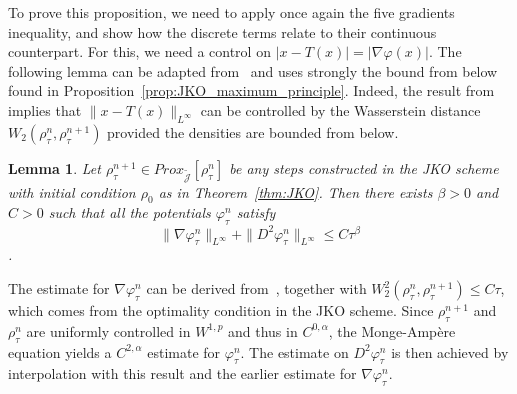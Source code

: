 \documentclass[a4paper,twosided, 11pt]{article}
\theoremstyle{plain}
\newtheorem{lemma}[thm]{Lemma}
\theoremstyle{remark}
\numberwithin{equation}{section}
\begin{document}
To prove this proposition, we need to apply once again the five gradients inequality, and show how the discrete terms relate to their continuous counterpart. For this, we need a control on $|x-T(x)| = |\nabla\varphi(x)|$. The following lemma can be adapted from~\cite[Proposition 5.3]{toshpulatov} and uses strongly the bound from below found in Proposition~\ref{prop:JKO_maximum_principle}. Indeed, the result from~\cite{Bouchitt2007ANL} implies that $\|x-T(x)\|_{L^{\infty}}$ can be controlled by the Wasserstein distance $W_{2}(\rho_{\tau}^{n}, \rho_{\tau}^{n+1})$ provided the densities are bounded from below. 
\begin{lemma}\label{lem:control_phi}
 Let $\rho^{n+1}_{\tau}\in Prox_{\widetilde{\mathcal{J}}}[\rho^{n}_{\tau}]$ be any steps constructed in the JKO scheme with initial condition $\rho_0$ as in Theorem~\ref{thm:JKO}. Then there exists $\beta>0$  and $C>0$ such that all the potentials $\varphi_{\tau}^{n}$ satisfy
$$\|\nabla\varphi_{\tau}^{n}\|_{L^{\infty}} + \|D^2\varphi_{\tau}^{n}\|_{L^{\infty}}\le C\tau^{\beta}$$.
\end{lemma}

The estimate for $\nabla\varphi_{\tau}^{n}$ can be derived from~\cite{Bouchitt2007ANL}, together with $W_{2}^{2}(\rho_{\tau}^{n},\rho_{\tau}^{n+1})\leq C\tau$, which comes from the optimality condition in the JKO scheme. Since $\rho_{\tau}^{n+1}$ and $\rho_{\tau}^{n}$ are uniformly controlled in $W^{1,p}$ and thus in $C^{0,\alpha}$, the Monge-Ampère equation yields a $C^{2,\alpha}$ estimate for $\varphi_{\tau}^{n}$. The estimate on $D^{2}\varphi_{\tau}^{n}$ is then achieved by interpolation with this result and the earlier estimate for $\nabla\varphi_{\tau}^{n}$.
\end{document}
